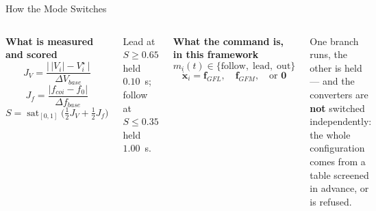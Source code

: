 \documentclass{beamer}
\begin{document}
\begin{frame}{How the Mode Switches}
\vspace{-0.04cm}
\begin{columns}[t,onlytextwidth]
\scriptsize
\textbf{What is measured and scored}
\vspace{-0.06cm}
\begin{equation}
J_V=\frac{\bigl|\,|V_i|-V_i^{\star}\,\bigr|}{\Delta V_{base}}
\end{equation}
\vspace{-0.30cm}
\begin{equation}
J_f=\frac{|f_{coi}-f_0|}{\Delta f_{base}}
\end{equation}
\vspace{-0.16cm}
\begin{equation}
S=\operatorname{sat}_{[0,1]}\!\bigl(\tfrac12 J_V+\tfrac12 J_f\bigr)
\end{equation}
\vspace{-0.24cm}

{\tiny Lead at $S\ge0.65$ held $0.10$~s; follow at $S\le0.35$ held $1.00$~s.}

\scriptsize
\textbf{What the command is, in this framework}
\vspace{-0.06cm}
\begin{equation}
m_i(t)\in\{\text{follow},\;\text{lead},\;\text{out}\}
\end{equation}
\vspace{-0.36cm}
\begin{equation}
\dot{\bm x}_i=\bm f_{GFL},\quad \bm f_{GFM},\quad\text{or }\bm 0
\end{equation}
\vspace{-0.24cm}

{\tiny One branch runs, the other is held --- and the converters are \textbf{not}
switched independently: the whole configuration comes from a table screened in
advance, or is refused.}
\end{columns}
\end{frame}
\end{document}
